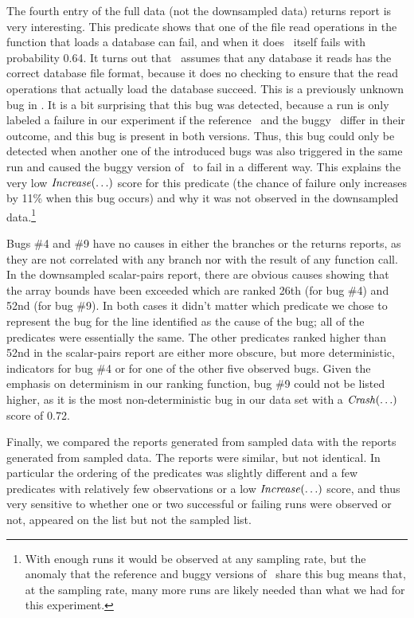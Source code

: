 The fourth entry of the full data (not the  downsampled data)
returns report is very interesting.  This predicate shows that one of
the file read operations in the function that loads a database can
fail, and when it does \moss\ itself fails with probability 0.64.
It turns out that \moss\ assumes that any database it reads has the
correct database file format, because it does no checking to ensure
that the read operations that actually load the database succeed.  This is a previously
unknown bug in \moss.  It is a bit surprising that this bug was detected,
because a run is only labeled a failure in our experiment if the
reference \moss\ and the buggy \moss\ differ in their outcome, and
this bug is present in both versions.  Thus, this bug could only be detected
when another one of the introduced bugs was also triggered in the same
run and caused the buggy version of \moss\ to fail in a different way.
This explains the very low $\mbox{\textit{Increase}}(\ldots)$ score for this
predicate (the chance of failure only increases by 11\% when this bug
occurs) and why it was not observed in the 
downsampled data.\footnote{With enough runs it would be observed at
  any sampling rate, but the anomaly that the reference and buggy
  versions of \moss\ share this bug means that, at the
   sampling rate, many more runs are likely needed
  than what we had for this experiment.}

Bugs \#4 and \#9 have no causes in either the branches or the returns
reports, as they are not correlated with any branch nor with the
result of any function call.  In the  downsampled
scalar-pairs report, there are obvious causes showing that the array
bounds have been exceeded which are ranked 26th (for bug \#4) and 52nd (for bug
\#9).  In both cases it didn't matter which predicate we chose to
represent the bug for the line identified as the cause of the bug; all
of the predicates were essentially the same.  The other
predicates ranked higher than 52nd in the scalar-pairs report are
either more obscure, but more deterministic, indicators for bug \#4 or
for one of the other five observed bugs.  Given the emphasis on
determinism in our ranking function, bug \#9 could not be listed
higher, as it is the most non-deterministic bug in our data set with a
$\mbox{\textit{Crash}}(\ldots)$ score of 0.72.

Finally, we compared the reports generated from  sampled data
with the reports generated from  sampled data.  The reports were
similar, but not identical.  In particular the ordering of the
predicates was slightly different and a few predicates with relatively
few observations or a low $\mbox{\textit{Increase}}(\ldots)$ score, and thus very
sensitive to whether one or two successful or failing runs were
observed or not, appeared on
the  list but not the  sampled list.

